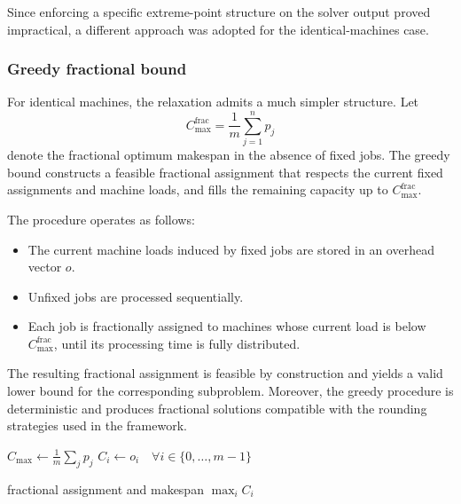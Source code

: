 Since enforcing a specific extreme-point structure on the solver output proved impractical, a different approach was adopted for the identical-machines case.

\subsubsection{Greedy fractional bound}
\label{subsec:greedy-bound}

For identical machines, the relaxation admits a much simpler structure.
Let
\[
  C_{\max}^{\text{frac}} = \frac{1}{m} \sum_{j=1}^{n} p_j
\]
denote the fractional optimum makespan in the absence of fixed jobs.
The greedy bound constructs a feasible fractional assignment that respects the current fixed assignments and machine loads, and fills the remaining capacity up to \(C_{\max}^{\text{frac}}\).

The procedure operates as follows:
\begin{itemize}
  \item The current machine loads induced by fixed jobs are stored in an overhead vector \(o\).
  \item Unfixed jobs are processed sequentially.
  \item Each job is fractionally assigned to machines whose current load is below \(C_{\max}^{\text{frac}}\), until its processing time is fully distributed.
\end{itemize}

The resulting fractional assignment is feasible by construction and yields a valid lower bound for the corresponding subproblem.
Moreover, the greedy procedure is deterministic and produces fractional solutions compatible with the rounding strategies used in the framework.

\begin{algorithm}[H]
\caption{Greedy fractional bound for identical machines}
\label{alg:greedy-bound}

$C_{\max} \gets \frac{1}{m}\sum_j p_j$\;
$C_i \gets o_i \quad \forall i \in \{0,\dots,m-1\}$\;


\Return fractional assignment and makespan $\max_i C_i$\;
\end{algorithm}

